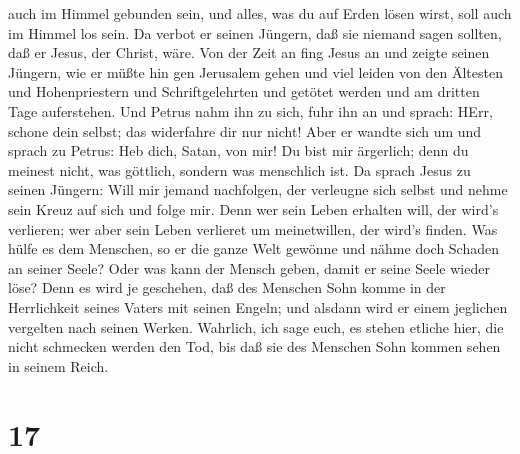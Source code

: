 auch im Himmel gebunden sein, und alles, was du auf Erden lösen wirst,
soll auch im Himmel los sein.  Da verbot er seinen Jüngern,
daß sie niemand sagen sollten, daß er Jesus, der Christ, wäre.
 Von der Zeit an fing Jesus an und zeigte seinen Jüngern,
wie er müßte hin gen Jerusalem gehen und viel leiden von den Ältesten
und Hohenpriestern und Schriftgelehrten und getötet werden und am
dritten Tage auferstehen.  Und Petrus nahm ihn zu sich,
fuhr ihn an und sprach: HErr, schone dein selbst; das widerfahre dir nur
nicht!  Aber er wandte sich um und sprach zu Petrus: Heb
dich, Satan, von mir! Du bist mir ärgerlich; denn du meinest nicht, was
göttlich, sondern was menschlich ist.  Da sprach Jesus zu
seinen Jüngern: Will mir jemand nachfolgen, der verleugne sich selbst
und nehme sein Kreuz auf sich und folge mir.  Denn wer sein
Leben erhalten will, der wird's verlieren; wer aber sein Leben verlieret
um meinetwillen, der wird's finden.  Was hülfe es dem
Menschen, so er die ganze Welt gewönne und nähme doch Schaden an seiner
Seele? Oder was kann der Mensch geben, damit er seine Seele wieder löse?
 Denn es wird je geschehen, daß des Menschen Sohn komme in
der Herrlichkeit seines Vaters mit seinen Engeln; und alsdann wird er
einem jeglichen vergelten nach seinen Werken.  Wahrlich,
ich sage euch, es stehen etliche hier, die nicht schmecken werden den
Tod, bis daß sie des Menschen Sohn kommen sehen in seinem Reich.

\hypertarget{section-16}{%
\section{17}\label{section-16}}

